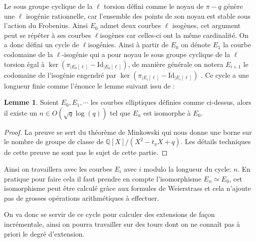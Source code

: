 \documentclass[10pt,a4paper]{book}
\theoremstyle{plain}
\theoremstyle{definition}
\newtheorem{lem}[thm]{Lemme}
\theoremstyle{definition}
\theoremstyle{definition}
\theoremstyle{definition}
\theoremstyle{remark}
\theoremstyle{remark}
\theoremstyle{definition}
\begin{document}
Le sous groupe cyclique de la $\ell$ torsion défini comme le noyau de $\pi -q$ génère une $\ell$ isogénie rationnelle, car l'ensemble des points de son noyau est stable sous l'action du Frobenius. Ainsi $E_0$ admet deux courbes $\ell$ isogènes, cet argument peut se répéter à ses courbes $\ell$isogènes car celles-ci ont la même cardinalité. On a donc défini un cycle de $\ell$isogénies. Ainsi à partir de $E_0$ on dénote $E_1$ la courbe codomaine de la $\ell$-isogénie qui a pour noyau le sous groupe cyclique de la $\ell$ torsion égal à $\ker (\pi_{|E_0[\ell]} - \mathrm{Id}_{|E_0[\ell]})$, de manière générale on notera $E_{i+1}$ le codomaine de l'isogénie engendré par $\ker (\pi_{|E_i[\ell]} - \mathrm{Id}_{|E_i[\ell]})$ . Ce cycle a une longueur finie comme l'énonce le lemme suivant issu de \cite{DeFeo-Doliskani-Schost13}:

\begin{lem}
Soient $E_0,E_1, \cdots$ les courbes elliptiques définies comme ci-dessus, alors il existe un $n \in O(\sqrt{q}\log(q))$ tel que $E_n$ est isomorphe à $E_0$.
\end{lem}

\begin{proof}
La preuve se sert du théorème de Minkowski qui nous donne une borne sur le nombre de groupe de classe de $\mathbb{Q}[X]/(X^2-t_{\pi}X+q)$. Les détails techniques de cette preuve ne sont pas le sujet de cette partie.
\end{proof}

Ainsi on travaillera avec les courbes $E_i$ avec $i$ modulo la longueur du cycle: $n$. En pratique pour faire cela il faut prendre en compte l'isomorphisme $E_n \simeq E_0$, cet isomorphisme peut être calculé grâce aux formules de Weierstrass et cela n'ajoute pas de grosses opérations arithmétiques à effectuer.

On va donc se servir de ce cycle pour calculer des extensions de façon incrémentale, ainsi on pourra travailler sur des tours dont on ne connaît pas à priori le degré d'extension. 
\end{document}
